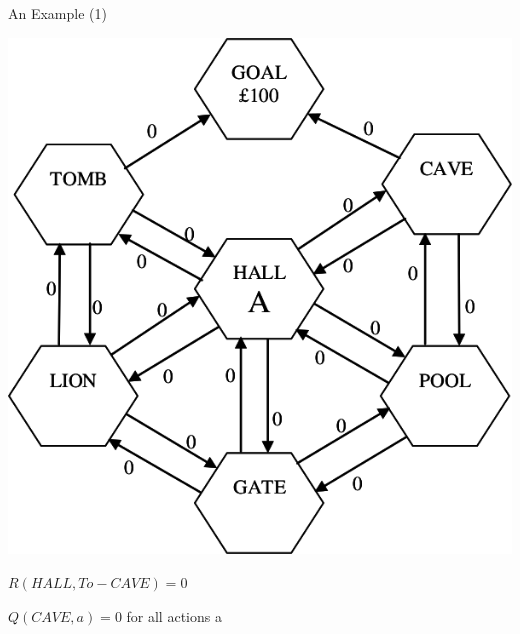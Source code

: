 \documentclass[]{beamer}
\begin{document}
\begin{frame}{An Example (1)}

\center
\includegraphics[scale=0.30]{figures/example1.png}

\(R(HALL, To-CAVE) = 0\)

\({Q}(CAVE,a) = 0\) for all actions a

\end{frame}
\end{document}
